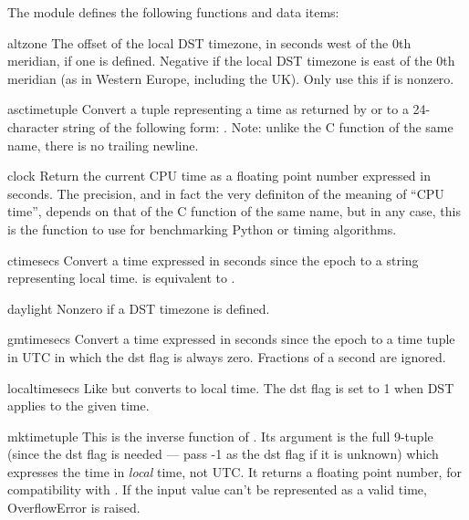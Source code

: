 The module defines the following functions and data items:

\renewcommand{\indexsubitem}{(in module time)}

\begin{datadesc}{altzone}
The offset of the local DST timezone, in seconds west of the 0th
meridian, if one is defined.  Negative if the local DST timezone is
east of the 0th meridian (as in Western Europe, including the UK).
Only use this if  is nonzero.
\end{datadesc}

\begin{funcdesc}{asctime}{tuple}
Convert a tuple representing a time as returned by  or
 to a 24-character string of the following form:
.  Note: unlike the C function of
the same name, there is no trailing newline.
\end{funcdesc}

\begin{funcdesc}{clock}{}
Return the current CPU time as a floating point number expressed in
seconds.  The precision, and in fact the very definiton of the meaning
of ``CPU time'', depends on that of the C function of the same name,
but in any case, this is the function to use for benchmarking Python
or timing algorithms.
\end{funcdesc}

\begin{funcdesc}{ctime}{secs}
Convert a time expressed in seconds since the epoch to a string
representing local time.   is equivalent to
.
\end{funcdesc}

\begin{datadesc}{daylight}
Nonzero if a DST timezone is defined.
\end{datadesc}

\begin{funcdesc}{gmtime}{secs}
Convert a time expressed in seconds since the epoch to a time tuple
in UTC in which the dst flag is always zero.  Fractions of a second are
ignored.
\end{funcdesc}

\begin{funcdesc}{localtime}{secs}
Like  but converts to local time.  The dst flag is set
to 1 when DST applies to the given time.
\end{funcdesc}

\begin{funcdesc}{mktime}{tuple}
This is the inverse function of .  Its argument is the
full 9-tuple (since the dst flag is needed --- pass -1 as the dst flag if
it is unknown) which expresses the time
in \emph{local} time, not UTC.  It returns a floating
point number, for compatibility with .  If the input
value can't be represented as a valid time, OverflowError is raised.
\end{funcdesc}

